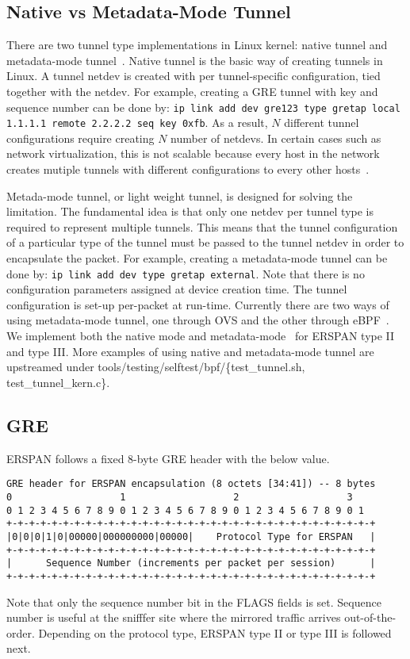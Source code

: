 \documentclass[10pt]{sigplanconf}
\begin{document}
\subsection{Native vs Metadata-Mode Tunnel}
There are two tunnel type implementations in Linux kernel:
native tunnel and metadata-mode tunnel~\cite{lwtunnel}.
Native tunnel is the basic way of creating tunnels in Linux.
A tunnel netdev is created with per tunnel-specific configuration,
tied together with the netdev. For example, creating a GRE tunnel
with key and sequence number can be done by:
\texttt{ip link add dev gre123 type gretap local 1.1.1.1 remote 2.2.2.2 seq key 0xfb}.
As a result, $N$ different tunnel configurations require creating
$N$ number of netdevs.  In certain cases such as network virtualization,
this is not scalable because every host in the network creates
mutiple tunnels with different configurations to every other hosts~\cite{nvp}.

Metada-mode tunnel, or light weight tunnel, is designed for solving
the limitation.  The fundamental idea is that only one netdev per
tunnel type is required to represent multiple tunnels.
This means that the tunnel configuration of a particular type
of the tunnel must be passed to the tunnel netdev in order
to encapsulate the packet.  For example, creating a metadata-mode
tunnel can be done by:
\texttt{ip link add dev type gretap external}.
Note that there is no configuration parameters assigned at device creation
time. The tunnel configuration is set-up per-packet at run-time.
Currently there are two ways of using metadata-mode tunnel, one through
OVS and the other through eBPF~\cite{daniel2}.
We implement both the native mode and metadata-mode~\cite{erspanmd}
for ERSPAN type II and type III.
More examples of using native and metadata-mode tunnel are upstreamed
under tools/testing/selftest/bpf/\{test\_tunnel.sh, test\_tunnel\_kern.c\}.

\subsection{GRE}
ERSPAN follows a fixed 8-byte GRE header with the below value.
{\scriptsize
\begin{verbatim}
GRE header for ERSPAN encapsulation (8 octets [34:41]) -- 8 bytes
0                   1                   2                   3
0 1 2 3 4 5 6 7 8 9 0 1 2 3 4 5 6 7 8 9 0 1 2 3 4 5 6 7 8 9 0 1
+-+-+-+-+-+-+-+-+-+-+-+-+-+-+-+-+-+-+-+-+-+-+-+-+-+-+-+-+-+-+-+-+
|0|0|0|1|0|00000|000000000|00000|    Protocol Type for ERSPAN   |
+-+-+-+-+-+-+-+-+-+-+-+-+-+-+-+-+-+-+-+-+-+-+-+-+-+-+-+-+-+-+-+-+
|      Sequence Number (increments per packet per session)      |
+-+-+-+-+-+-+-+-+-+-+-+-+-+-+-+-+-+-+-+-+-+-+-+-+-+-+-+-+-+-+-+-+
\end{verbatim}
}
Note that only the sequence number bit in the FLAGS fields is set.
Sequence number is useful at the snifffer site where the mirrored
traffic arrives out-of-the-order.  Depending on the protocol type,
ERSPAN type II or type III is followed next.
\end{document}
